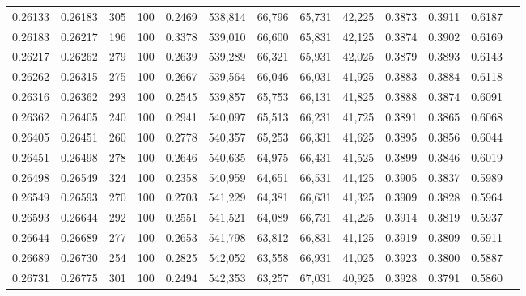 \begin{tabular}{rrrrrrrrrrrrr}
0.26133 & 0.26183 &   305 & 100 &                                     0.2469 & 538,814 &  66,796 &  65,731 &  42,225 & 0.3873 & 0.3911 & 0.6187 \\
0.26183 & 0.26217 &   196 & 100 &                                     0.3378 & 539,010 &  66,600 &  65,831 &  42,125 & 0.3874 & 0.3902 & 0.6169 \\
0.26217 & 0.26262 &   279 & 100 &                                     0.2639 & 539,289 &  66,321 &  65,931 &  42,025 & 0.3879 & 0.3893 & 0.6143 \\
0.26262 & 0.26315 &   275 & 100 &                                     0.2667 & 539,564 &  66,046 &  66,031 &  41,925 & 0.3883 & 0.3884 & 0.6118 \\
0.26316 & 0.26362 &   293 & 100 &                                     0.2545 & 539,857 &  65,753 &  66,131 &  41,825 & 0.3888 & 0.3874 & 0.6091 \\
0.26362 & 0.26405 &   240 & 100 &                                     0.2941 & 540,097 &  65,513 &  66,231 &  41,725 & 0.3891 & 0.3865 & 0.6068 \\
0.26405 & 0.26451 &   260 & 100 &                                     0.2778 & 540,357 &  65,253 &  66,331 &  41,625 & 0.3895 & 0.3856 & 0.6044 \\
0.26451 & 0.26498 &   278 & 100 &                                     0.2646 & 540,635 &  64,975 &  66,431 &  41,525 & 0.3899 & 0.3846 & 0.6019 \\
0.26498 & 0.26549 &   324 & 100 &                                     0.2358 & 540,959 &  64,651 &  66,531 &  41,425 & 0.3905 & 0.3837 & 0.5989 \\
0.26549 & 0.26593 &   270 & 100 &                                     0.2703 & 541,229 &  64,381 &  66,631 &  41,325 & 0.3909 & 0.3828 & 0.5964 \\
0.26593 & 0.26644 &   292 & 100 &                                     0.2551 & 541,521 &  64,089 &  66,731 &  41,225 & 0.3914 & 0.3819 & 0.5937 \\
0.26644 & 0.26689 &   277 & 100 &                                     0.2653 & 541,798 &  63,812 &  66,831 &  41,125 & 0.3919 & 0.3809 & 0.5911 \\
0.26689 & 0.26730 &   254 & 100 &                                     0.2825 & 542,052 &  63,558 &  66,931 &  41,025 & 0.3923 & 0.3800 & 0.5887 \\
0.26731 & 0.26775 &   301 & 100 &                                     0.2494 & 542,353 &  63,257 &  67,031 &  40,925 & 0.3928 & 0.3791 & 0.5860 \\

\end{tabular}
